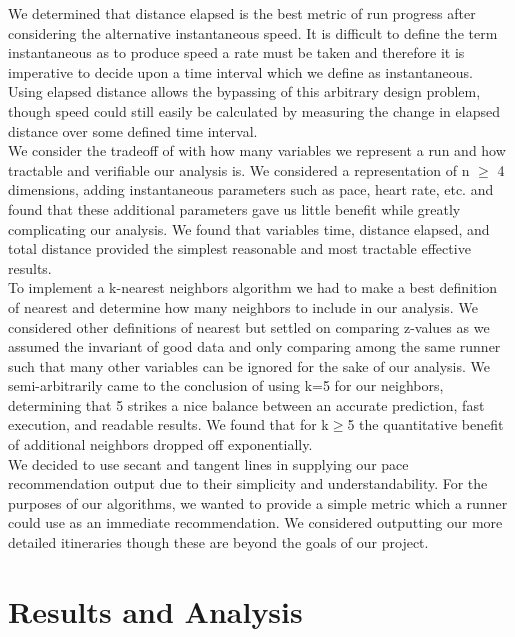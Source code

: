 \documentclass[twoside]{article}
\begin{document}
\begin{multicols}{2}
	We determined that distance elapsed is the best metric of run progress after considering the alternative instantaneous speed.  It is difficult to define the term instantaneous as to produce speed a rate must be taken and therefore it is imperative to decide upon a time interval which we define as instantaneous.  Using elapsed distance allows the bypassing of this arbitrary design problem, though speed could still easily be calculated by measuring the change in elapsed distance over some defined time interval.\\
	
	We consider the tradeoff of with how many variables we represent a run and how tractable and verifiable our analysis is.  We considered a representation of n $\ge$ 4 dimensions, adding instantaneous parameters such as pace, heart rate, etc. and found that these additional parameters gave us little benefit while greatly complicating our analysis.  We found that variables time, distance elapsed, and total distance provided the simplest reasonable and most tractable effective results.\\
	
	To implement a k-nearest neighbors algorithm we had to make a best definition of nearest and determine how many neighbors to include in our analysis.  We considered other definitions of nearest but settled on comparing z-values as we assumed the invariant of good data and only comparing among the same runner such that many other variables can be ignored for the sake of our analysis.  We semi-arbitrarily came to the conclusion of using k=5 for our neighbors, determining that 5 strikes a nice balance between an accurate prediction, fast execution, and readable results.  We found that for k$\ge$5 the quantitative benefit of additional neighbors dropped off exponentially.\\
	
	We decided to use secant and tangent lines in supplying our pace recommendation output due to their simplicity and understandability. For the purposes of our algorithms, we wanted to provide a simple metric which a runner could use as an immediate recommendation.  We considered outputting our more detailed itineraries though these are beyond the goals of our project.\\




\section{Results and Analysis}


\end{multicols}
\end{document}
